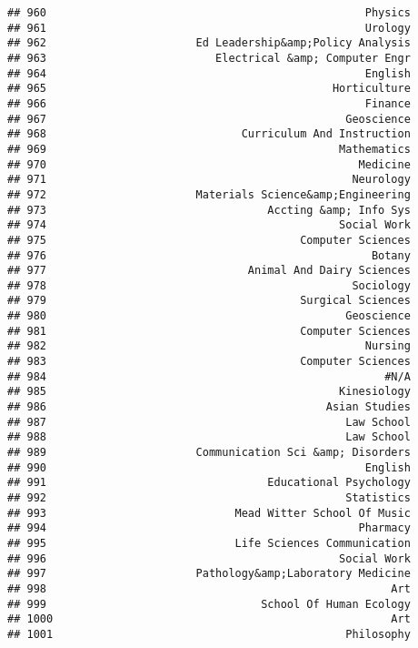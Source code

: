 \documentclass[
]{article}
\begin{document}
\begin{verbatim}
## 960                                                 Physics
## 961                                                 Urology
## 962                       Ed Leadership&amp;Policy Analysis
## 963                          Electrical &amp; Computer Engr
## 964                                                 English
## 965                                            Horticulture
## 966                                                 Finance
## 967                                              Geoscience
## 968                              Curriculum And Instruction
## 969                                             Mathematics
## 970                                                Medicine
## 971                                               Neurology
## 972                       Materials Science&amp;Engineering
## 973                                  Accting &amp; Info Sys
## 974                                             Social Work
## 975                                       Computer Sciences
## 976                                                  Botany
## 977                               Animal And Dairy Sciences
## 978                                               Sociology
## 979                                       Surgical Sciences
## 980                                              Geoscience
## 981                                       Computer Sciences
## 982                                                 Nursing
## 983                                       Computer Sciences
## 984                                                    #N/A
## 985                                             Kinesiology
## 986                                           Asian Studies
## 987                                              Law School
## 988                                              Law School
## 989                       Communication Sci &amp; Disorders
## 990                                                 English
## 991                                  Educational Psychology
## 992                                              Statistics
## 993                             Mead Witter School Of Music
## 994                                                Pharmacy
## 995                             Life Sciences Communication
## 996                                             Social Work
## 997                       Pathology&amp;Laboratory Medicine
## 998                                                     Art
## 999                                 School Of Human Ecology
## 1000                                                    Art
## 1001                                             Philosophy

\end{verbatim}
\end{document}
